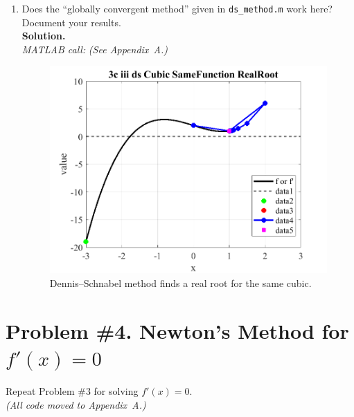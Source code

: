 \documentclass[11pt]{article}
\begin{document}
\begin{enumerate}[label=3(\alph*)]
\begin{enumerate}[label=\roman*)]
			\item Does the “globally convergent method” given in \texttt{ds\_method.m} work here? Document your results.\\
			\textbf{Solution.}\\
			\textit{MATLAB call:} \emph{(See Appendix~A.)}
			
			\begin{figure}[H]\centering
				\includegraphics[width=0.78\linewidth]{plots/3c_iii_ds_Cubic_SameFunction_RealRoot.png}
				\caption{Dennis--Schnabel method finds a real root for the same cubic.}
			\end{figure}
			
		\end{enumerate}
		
	\end{enumerate}
	
	\newpage
	\section*{Problem \#4. Newton’s Method for $f'(x)=0$}
	
	Repeat Problem \#3 for solving $f'(x)=0$.\\
	\emph{(All code moved to Appendix~A.)}
	
\end{document}
